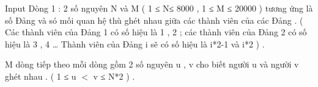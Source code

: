 Input
Dòng 1 : 2 số nguyên N và M ( 1 ≤ N≤ 8000 , 1 ≤ M ≤ 20000 ) tương ứng là số Đảng và só mối quan hệ thù ghét nhau giữa các thành viên của các Đảng . ( Các thành viên của Đảng 1 có số hiệu là 1 , 2 ; các thành viên của Đảng 2 có số hiệu là 3 , 4 … Thành viên của Đảng i sẽ có số hiệu là i*2-1 và i*2 ) .   


   M dòng tiếp theo mỗi dòng gồm 2 số nguyên u , v cho biết người u và người v ghét nhau . ( 1 ≤ u $<$ v ≤ N*2 ) .